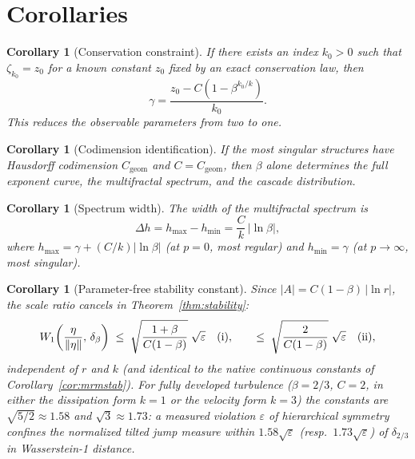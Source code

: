 \documentclass[12pt]{amsart}
\newtheorem{corollary}[theorem]{Corollary}
\theoremstyle{definition}
\theoremstyle{remark}
\begin{document}
\section{Corollaries}
\label{sec:corollaries}

\begin{corollary}[Conservation constraint]\label{cor:conservation}
If there exists an index $k_0 > 0$ such that $\zeta_{k_0} = z_0$ for
a known constant $z_0$ fixed by an exact conservation law, then
\[
  \gamma = \frac{z_0 - C(1-\beta^{k_0/k})}{k_0}.
\]
This reduces the observable parameters from two to one.
\end{corollary}

\begin{corollary}[Codimension identification]\label{cor:codimension}
If the most singular structures have Hausdorff codimension
$C_{\mathrm{geom}}$ and $C = C_{\mathrm{geom}}$, then $\beta$
alone determines the full exponent curve, the multifractal spectrum,
and the cascade distribution.
\end{corollary}

\begin{corollary}[Spectrum width]\label{cor:width}
The width of the multifractal spectrum is
\[
  \Delta h = h_{\max} - h_{\min} = \frac{C}{k}\,|\ln\beta|,
\]
where $h_{\max} = \gamma + (C/k)|\ln\beta|$ (at $p = 0$, most
regular) and $h_{\min} = \gamma$ (at $p \to \infty$, most singular).
\end{corollary}

\begin{corollary}[Parameter-free stability constant]\label{cor:constant}
Since $|A| = C(1-\beta)\,|\ln r|$, the scale ratio cancels in
Theorem~\textup{\ref{thm:stability}}:
\[
  W_1\!\left(\frac{\eta}{\|\eta\|},\,\delta_\beta\right)
  \;\le\; \sqrt{\frac{1+\beta}{C(1-\beta)}}\;\sqrt{\varepsilon}
  \quad\textup{(i)},
  \qquad
  \le\; \sqrt{\frac{2}{C(1-\beta)}}\;\sqrt{\varepsilon}
  \quad\textup{(ii)},
\]
independent of $r$ and $k$ (and identical to the native continuous
constants of Corollary~\ref{cor:mrmstab}).  For fully developed
turbulence ($\beta = 2/3$, $C = 2$, in either the dissipation form
$k=1$ or the velocity form $k=3$) the constants are $\sqrt{5/2}
\approx 1.58$ and $\sqrt{3} \approx 1.73$: a measured violation
$\varepsilon$ of hierarchical symmetry confines the normalized
tilted jump measure within $1.58\sqrt{\varepsilon}$
(resp.\ $1.73\sqrt{\varepsilon}$) of $\delta_{2/3}$ in
Wasserstein-1 distance.
\end{corollary}
\end{document}
